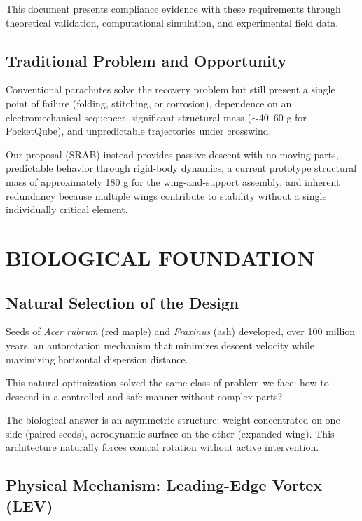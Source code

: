 \documentclass[12pt,a4paper]{article}
\begin{document}
This document presents compliance evidence with these requirements through theoretical validation, computational simulation, and experimental field data.

\subsection{Traditional Problem and Opportunity}

Conventional parachutes solve the recovery problem but still present a single point of failure (folding, stitching, or corrosion), dependence on an electromechanical sequencer, significant structural mass ($\sim$40--60 g for PocketQube), and unpredictable trajectories under crosswind.

Our proposal (SRAB) instead provides passive descent with no moving parts, predictable behavior through rigid-body dynamics, a current prototype structural mass of approximately 180 g for the wing-and-support assembly, and inherent redundancy because multiple wings contribute to stability without a single individually critical element.

\vspace{0.5em}

\section{BIOLOGICAL FOUNDATION}
\label{sec:biological-foundation}

\subsection{Natural Selection of the Design}

Seeds of \textit{Acer rubrum} (red maple) and \textit{Fraxinus} (ash) developed, over 100 million years, an autorotation mechanism that minimizes descent velocity while maximizing horizontal dispersion distance.

This natural optimization solved the same class of problem we face: how to descend in a controlled and safe manner without complex parts?

The biological answer is an asymmetric structure: weight concentrated on one side (paired seeds), aerodynamic surface on the other (expanded wing). This architecture naturally forces conical rotation without active intervention.

\subsection{Physical Mechanism: Leading-Edge Vortex (LEV)}
\end{document}
